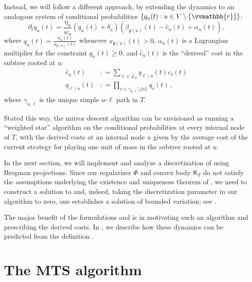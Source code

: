 \documentclass{toc}
\newcommand{\calL}{\mathcal L}
\newcommand{\vvr}{\vvmathbb{r}}
\newcommand{\seteq}{\mathrel{\mathop:}=}
\newcommand{\sfp}{\mathsf{p}}
\newcommand{\sfK}{\mathsf K}
\begin{document}
Instead, we will follow a different approach, by extending the dynamics
to an analogous system of conditional probabilities
$\{q_u(t) : u \in V \setminus \{\vvr\}\}$:
\begin{equation}\label{eq:star-dynamics}
\partial_t q_u(t) = \frac{\eta_u}{w_u} \left(q_u(t)+\delta_u\right) \left(\beta_{\sfp(u)}(t) - \hat{c}_u(t) + \alpha_u(t)\right),
\end{equation}
where $q_u(t) = \frac{x_u(t)}{x_{\sfp(u)}(t)}$ whenever $x_{\sfp(u)}(t) > 0$, $\alpha_u(t)$ is a Lagrangian multiplier for the constraint $q_u(t)\ge 0$, and $\hat{c}_u(t)$ is the ``derived'' cost
in the subtree rooted at $u$:
\begin{align*}
\hat{c}_u(t) &\seteq \sum_{\ell \in \calL_u} q_{\ell\mid u}(t) c_{\ell}(t)\\
q_{\ell \mid u}(t) &\seteq \prod_{v \in \gamma_{u,\ell} \setminus \{u\}} q_v(t)\,,\nonumber
\end{align*}
where $\gamma_{u,\ell}$ is the unique simple $u$-$\ell$ path in $T$.

Stated this way, the mirror descent algorithm can be envisioned as
running a ``weighted star'' algorithm on the conditional
probabilities at every internal node of $T$, with the derived
costs at an internal node $u$ given by the average cost of the current strategy
for playing one unit of mass in the subtree rooted at $u$.

In the next section, we will implement and analyze a discretization of 
using Bregman projections.
Since our regularizer $\Phi$ and convex body $\sfK_T$ do not satisfy
the assumptions underlying the existence and uniqueness theorem of \cite{BCLLM18},
we need to construct a solution to 
and, indeed, taking the discretization parameter in our algorithm to zero,
one establishes a solution of bounded variation; see .

The major benefit of the formulations  and 
is in motivating such an algorithm and prescribing the derived costs.
In , we describe how these dynamics
can be predicted from the definition .



\section{The MTS algorithm}\label{sec:main}
\end{document}
